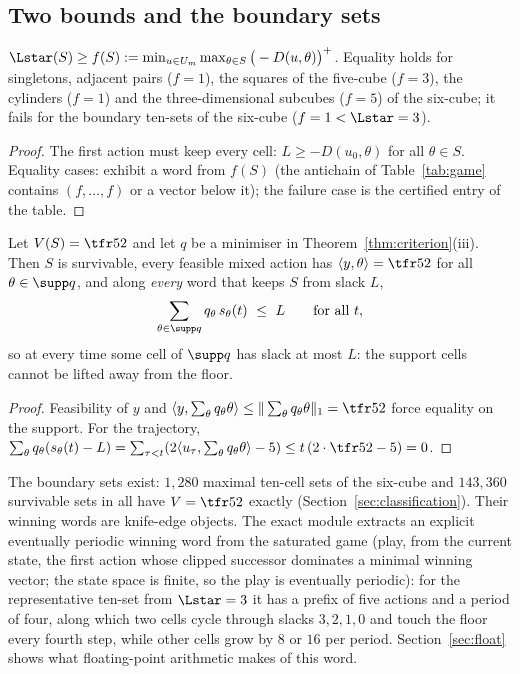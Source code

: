 \subsection{Two bounds and the boundary sets}
\begin{proposition}\label{prop:firststep}
$\Lstar(S)\ge f(S):=\min_{u\in U_m}\max_{\theta\in S}\big(-D(u,\theta)\big)^+$. Equality holds for singletons, adjacent pairs ($f=1$), the squares of the five-cube ($f=3$), the cylinders ($f=1$) and the three-dimensional subcubes ($f=5$) of the six-cube; it fails for the boundary ten-sets of the six-cube ($f=1<\Lstar=3$).
\end{proposition}
\begin{proof}
The first action must keep every cell: $L\ge-D(u_0,\theta)$ for all $\theta\in S$. Equality cases: exhibit a word from $f(S)$ (the antichain of Table~\ref{tab:game} contains $(f,\dots,f)$ or a vector below it); the failure case is the certified entry of the table.
\end{proof}

\begin{proposition}\label{prop:pinned}
Let $V(S)=\tfr52$ and let $q$ be a minimiser in Theorem~\ref{thm:criterion}(iii). Then $S$ is survivable, every feasible mixed action has $\langle y,\theta\rangle=\tfr52$ for all $\theta\in\supp q$, and along \emph{every} word that keeps $S$ from slack $L$,
\[\sum_{\theta\in\supp q}q_\theta\,s_\theta(t)\ \le\ L\qquad\text{for all }t,\]
so at every time some cell of $\supp q$ has slack at most $L$: the support cells cannot be lifted away from the floor.
\end{proposition}
\begin{proof}
Feasibility of $y$ and $\langle y,\sum_\theta q_\theta\theta\rangle\le\|\sum_\theta q_\theta\theta\|_1=\tfr52$ force equality on the support. For the trajectory, $\sum_\theta q_\theta(s_\theta(t)-L)=\sum_{\tau<t}(2\langle u_\tau,\sum_\theta q_\theta\theta\rangle-5)\le t\,(2\cdot\tfr52-5)=0$.
\end{proof}

The boundary sets exist: $1{,}280$ maximal ten-cell sets of the six-cube and $143{,}360$ survivable sets in all have $V=\tfr52$ exactly (Section~\ref{sec:classification}). Their winning words are knife-edge objects. The exact module extracts an explicit eventually periodic winning word from the saturated game (play, from the current state, the first action whose clipped successor dominates a minimal winning vector; the state space is finite, so the play is eventually periodic): for the representative ten-set from $\Lstar=3$ it has a prefix of five actions and a period of four, along which two cells cycle through slacks $3,2,1,0$ and touch the floor every fourth step, while other cells grow by $8$ or $16$ per period. Section~\ref{sec:float} shows what floating-point arithmetic makes of this word.

